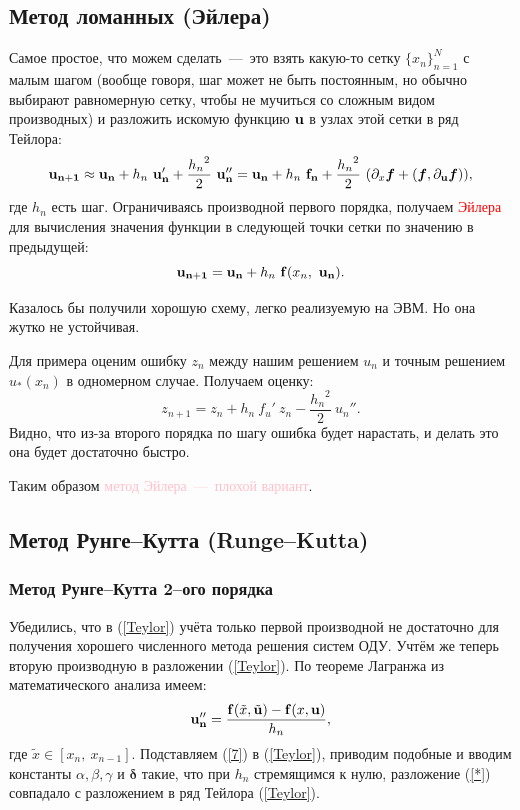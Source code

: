 \documentclass[a4,14pt,russian]{article}
\begin{document}
\subsection{Метод ломанных (Эйлера)}
    Самое простое, что можем сделать~---~это взять какую-то сетку $\bigl\{x_n\bigl\}_{n=1}^N$ с малым шагом (вообще говоря, шаг может не быть постоянным, но обычно выбирают равномерную сетку, чтобы не мучиться со сложным видом производных) и разложить искомую функцию ${\bf u}$ в узлах этой сетки в ряд Тейлора: 
    \begin{equation}\label{Teylor}
        {\bf u_{n+1}} \approx {\bf u_{n}} + h_n\ {\bf u_{n}'} + \frac{{h_n}^2}{2}\ {\bf u_{n}''} = {\bf u_{n}} + h_n\ {\bf f_{n}} + \frac{{h_n}^2}{2}\ ( \partial_x \boldsymbol{f} + (\boldsymbol{f}, \partial_{\bf u}\boldsymbol{f})  ), 
    \end{equation}
    где $h_n$ есть шаг. Ограничиваясь производной первого порядка, получаем \textcolor{red}{ Эйлера} для вычисления значения функции в следующей точки сетки по значению в предыдущей:
    \begin{equation}\label{Eyler}
       {\bf u_{n+1}} = {\bf u_{n}} + h_n\ {\bf f}(x_n,\ {\bf u_{n}}).
    \end{equation}\par
    Казалось бы получили хорошую схему, легко реализуемую на ЭВМ. Но она жутко не устойчивая.\par
    Для примера оценим ошибку $z_n$ между нашим решением $u_n$ и точным решением $u_*(x_n)$ в одномерном случае. Получаем оценку:
    \begin{equation}\label{6}
        z_{n+1} = z_n + h_n\ f_u'\ z_n - \frac{{h_n}^2}{2}\ u_n''.
    \end{equation}
    Видно, что из-за второго порядка по шагу ошибка будет нарастать, и делать это она будет достаточно быстро.\par Таким образом 
    \textcolor{pink}{метод Эйлера~---~плохой вариант}.
\subsection{Метод Рунге--Кутта (Runge--Kutta)}
\subsubsection{Метод Рунге--Кутта 2--ого порядка}
    Убедились, что в (\ref{Teylor}) учёта только первой производной не достаточно для получения хорошего численного метода решения систем ОДУ. Учтём же теперь вторую производную в разложении (\ref{Teylor}). По теореме Лагранжа из математического анализа имеем:
    \begin{equation}\label{7}
        {\bf u_{n}''} = \frac{{\bf f}(\tilde x, \tilde {\bf u}) - {\bf f}( x, {\bf u})}{h_n},
    \end{equation}
    где $\tilde x \in[ x_n,\ x_{n-1}]$. Подставляем (\ref{7}) в (\ref{Teylor}), приводим подобные и вводим константы $\alpha, \beta, \gamma$ и $\boldsymbol{\delta}$ такие, что при $h_n$ стремящимся к нулю, разложение (\ref{*}) совпадало с разложением в ряд Тейлора (\ref{Teylor}).
    
\end{document}
